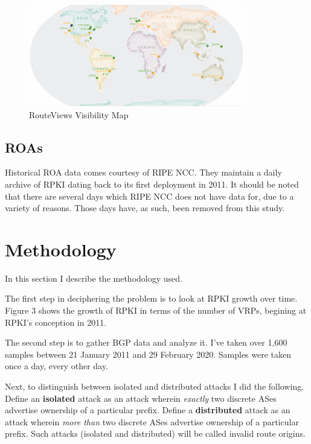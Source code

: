 \begin{figure}[tp]
    \begin{center}
        \includegraphics[width=\textwidth, height=1.75in, keepaspectratio]{figures/rv-map.png}
    \end{center}
    \caption{RouteViews Visibility Map}
\end{figure}


\subsection{ROAs}
Historical ROA data comes courtesy of RIPE NCC. They maintain a daily archive of
RPKI dating back to its first deployment in 2011. It should be noted that there
are several days which RIPE NCC does not have data for, due to a variety of
reasons. Those days have, as such, been removed from this study.

\section{Methodology}
In this section I describe the methodology used.

The first step in deciphering the problem is to look at RPKI growth over time.
Figure 3 shows the growth of RPKI in terms of the number of VRPs, begining at
RPKI's conception in 2011.

The second step is to gather BGP data and analyze it. I've taken over 1,600
samples between 21 January 2011 and 29 February 2020. Samples were taken once a
day, every other day.

Next, to distinguish between isolated and distributed attacks I did the
following. Define an {\bf isolated} attack as an attack wherein {\em exactly}
two discrete ASes advertise ownership of a particular prefix. Define a {\bf
distributed} attack as an attack wherein {\em more than} two discrete ASes
advertise ownership of a particular prefix. Such attacks (isolated and
distributed) will be called invalid route origins.

